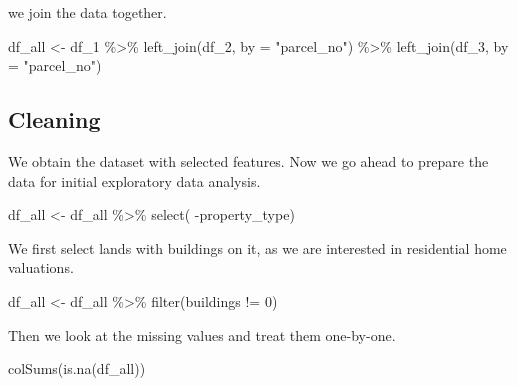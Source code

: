 \documentclass[
  english,
  letterpaper,
  DIV=11,
  numbers=noendperiod]{scrreprt}
\newenvironment{Shaded}{\begin{snugshade}}{\end{snugshade}}
\newcommand{\AttributeTok}[1]{\textcolor[rgb]{0.40,0.45,0.13}{#1}}
\newcommand{\DecValTok}[1]{\textcolor[rgb]{0.68,0.00,0.00}{#1}}
\newcommand{\FunctionTok}[1]{\textcolor[rgb]{0.28,0.35,0.67}{#1}}
\newcommand{\NormalTok}[1]{\textcolor[rgb]{0.00,0.23,0.31}{#1}}
\newcommand{\OtherTok}[1]{\textcolor[rgb]{0.00,0.23,0.31}{#1}}
\newcommand{\SpecialCharTok}[1]{\textcolor[rgb]{0.37,0.37,0.37}{#1}}
\newcommand{\StringTok}[1]{\textcolor[rgb]{0.13,0.47,0.30}{#1}}
\begin{document}
we join the data together.

\begin{Shaded}
\begin{Highlighting}[]
\NormalTok{df\_all }\OtherTok{\textless{}{-}}\NormalTok{ df\_1 }\SpecialCharTok{\%\textgreater{}\%}
  \FunctionTok{left\_join}\NormalTok{(df\_2, }\AttributeTok{by =} \StringTok{"parcel\_no"}\NormalTok{) }\SpecialCharTok{\%\textgreater{}\%}
  \FunctionTok{left\_join}\NormalTok{(df\_3, }\AttributeTok{by =} \StringTok{"parcel\_no"}\NormalTok{)}
\end{Highlighting}
\end{Shaded}

\subsection{Cleaning}\label{cleaning}

We obtain the dataset with selected features. Now we go ahead to prepare
the data for initial exploratory data analysis.

\begin{Shaded}
\begin{Highlighting}[]
\NormalTok{df\_all }\OtherTok{\textless{}{-}}\NormalTok{ df\_all }\SpecialCharTok{\%\textgreater{}\%} 
  \FunctionTok{select}\NormalTok{( }\SpecialCharTok{{-}}\NormalTok{property\_type)}
\end{Highlighting}
\end{Shaded}

We first select lands with buildings on it, as we are interested in
residential home valuations.

\begin{Shaded}
\begin{Highlighting}[]
\NormalTok{df\_all }\OtherTok{\textless{}{-}}\NormalTok{ df\_all }\SpecialCharTok{\%\textgreater{}\%} 
  \FunctionTok{filter}\NormalTok{(buildings }\SpecialCharTok{!=} \DecValTok{0}\NormalTok{)}
\end{Highlighting}
\end{Shaded}

Then we look at the missing values and treat them one-by-one.

\begin{Shaded}
\begin{Highlighting}[]
\FunctionTok{colSums}\NormalTok{(}\FunctionTok{is.na}\NormalTok{(df\_all))}
\end{Highlighting}
\end{Shaded}
\end{document}
